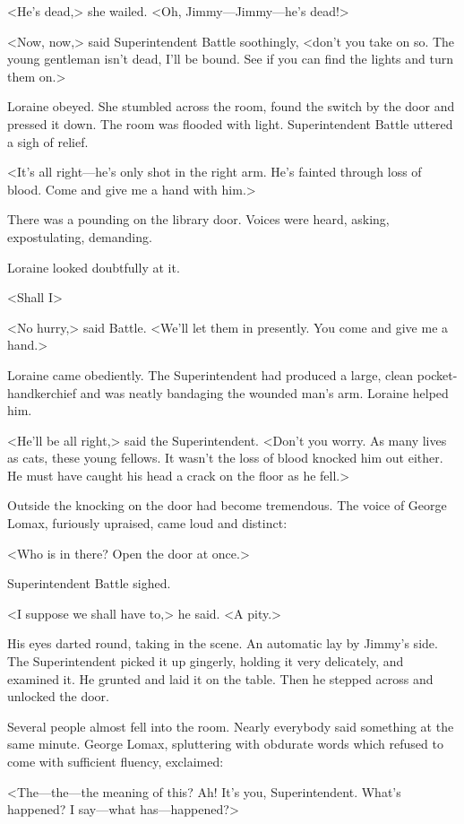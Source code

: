 <He's dead,> she wailed. <Oh, Jimmy—Jimmy—he's dead!>

<Now, now,> said Superintendent Battle soothingly, <don't you take on so. The young gentleman isn't dead, I'll be bound. See if you can find the lights and turn them on.>

Loraine obeyed. She stumbled across the room, found the switch by the door and pressed it down. The room was flooded with light. Superintendent Battle uttered a sigh of relief.

<It's all right—he's only shot in the right arm. He's fainted through loss of blood. Come and give me a hand with him.>

There was a pounding on the library door. Voices were heard, asking, expostulating, demanding.

Loraine looked doubtfully at it.

<Shall I\longdash>

<No hurry,> said Battle. <We'll let them in presently. You come and give me a hand.>

Loraine came obediently. The Superintendent had produced a large, clean pocket-handkerchief and was neatly bandaging the wounded man's arm. Loraine helped him.

<He'll be all right,> said the Superintendent. <Don't you worry. As many lives as cats, these young fellows. It wasn't the loss of blood knocked him out either. He must have caught his head a crack on the floor as he fell.>

Outside the knocking on the door had become tremendous. The voice of George Lomax, furiously upraised, came loud and distinct:

<Who is in there? Open the door at once.>

Superintendent Battle sighed.

<I suppose we shall have to,> he said. <A pity.>

His eyes darted round, taking in the scene. An automatic lay by Jimmy's side. The Superintendent picked it up gingerly, holding it very delicately, and examined it. He grunted and laid it on the table. Then he stepped across and unlocked the door.

Several people almost fell into the room. Nearly everybody said something at the same minute. George Lomax, spluttering with obdurate words which refused to come with sufficient fluency, exclaimed:

<The—the—the meaning of this? Ah! It's you, Superintendent. What's happened? I say—what has—happened?>

